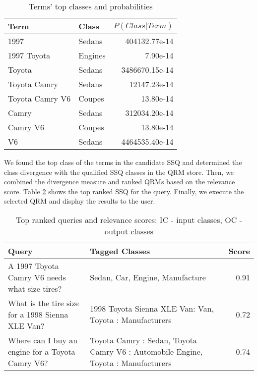 \begin{table}[h]\footnotesize

\begin{tabular}{| p{3.2cm} | l | r |}
\hline 
Term & Class & $P(Class|Term)$ \\ \hline
1997 & Sedans & 404132.77e-14\\ 
1997 Toyota & Engines & 7.90e-14\\ 
Toyota  & Sedans & 3486670.15e-14\\ 
Toyota Camry & Sedans & 12147.23e-14\\ 
Toyota Camry V6 & Coupes & 13.80e-14\\ 
Camry & Sedans & 312034.20e-14\\ 
Camry V6 & Coupes & 13.80e-14\\ 
V6 & Sedans & 4464535.40e-14\\ \hline
\end{tabular}        

\caption{Terms' top classes and probabilities}
\label{tbl:term_classes}   

\end{table}

We found the top class of the terms in the candidate SSQ and determined the class divergence with the qualified SSQ classes in the QRM store. Then, we combined the divergence measure and ranked QRMs based on the relevance score. Table \ref{tbl:ranked_queries} shows the top ranked SSQ for the query.  Finally, we execute the selected QRM and display the results to the user.

\begin{table}[h]\footnotesize

\begin{tabular}{| p{3.5cm} | p{3cm} | r |}
	\hline
	Query & Tagged Classes & Score\\ 
	\hline
	\small A 1997 Toyota Camry V6 needs what size tires? & \small Sedan, Car, Engine, Manufacture & 0.91\\ 
	\hline 
	\small What is the tire size for a 1998 Sienna XLE Van? & \small 1998 Toyota Sienna XLE Van: Van, Toyota : Manufacturers & 0.72\\
	\hline 
	\small Where can I buy an engine for a Toyota Camry V6? & \small Toyota Camry : Sedan, Toyota Camry V6 : Automobile Engine, Toyota : Manufacturers & 0.74 \\
	\hline 
\end{tabular}

\caption{Top ranked queries and relevance scores: IC - input classes, OC - output classes}
\label{tbl:ranked_queries}   

\end{table}


